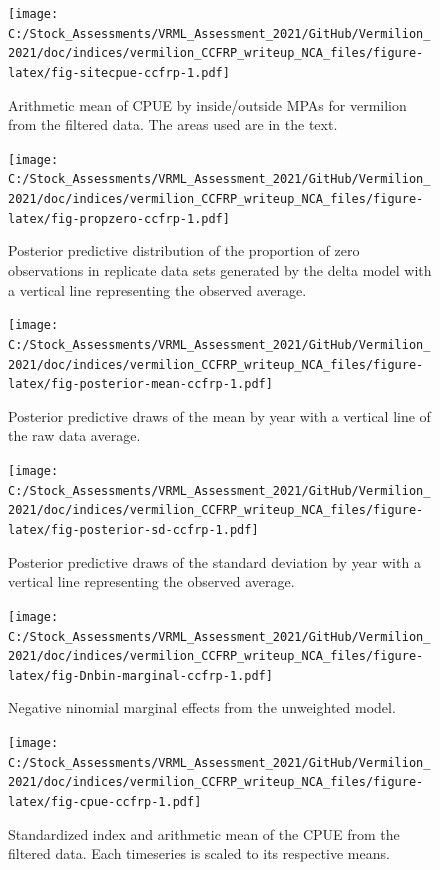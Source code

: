 \documentclass[
  english,
  a4paper,
]{article}
\begin{document}
\begin{figure}
\centering
\texttt{[image: C:/Stock\_Assessments/VRML\_Assessment\_2021/GitHub/Vermilion\_2021/doc/indices/vermilion\_CCFRP\_writeup\_NCA\_files/figure-latex/fig-sitecpue-ccfrp-1.pdf]}
\caption{\label{fig:fig-sitecpue-ccfrp}Arithmetic mean of CPUE by inside/outside MPAs for vermilion from the filtered data. The areas used are in the text.}
\end{figure}

\begin{figure}
\centering
\texttt{[image: C:/Stock\_Assessments/VRML\_Assessment\_2021/GitHub/Vermilion\_2021/doc/indices/vermilion\_CCFRP\_writeup\_NCA\_files/figure-latex/fig-propzero-ccfrp-1.pdf]}
\caption{\label{fig:fig-propzero-ccfrp}Posterior predictive distribution of the proportion of zero observations in replicate data sets generated by the delta model with a vertical line representing the observed average.}
\end{figure}

\begin{figure}
\centering
\texttt{[image: C:/Stock\_Assessments/VRML\_Assessment\_2021/GitHub/Vermilion\_2021/doc/indices/vermilion\_CCFRP\_writeup\_NCA\_files/figure-latex/fig-posterior-mean-ccfrp-1.pdf]}
\caption{\label{fig:fig-posterior-mean-ccfrp}Posterior predictive draws of the mean by year with a vertical line of the raw data average.}
\end{figure}

\begin{figure}
\centering
\texttt{[image: C:/Stock\_Assessments/VRML\_Assessment\_2021/GitHub/Vermilion\_2021/doc/indices/vermilion\_CCFRP\_writeup\_NCA\_files/figure-latex/fig-posterior-sd-ccfrp-1.pdf]}
\caption{\label{fig:fig-posterior-sd-ccfrp}Posterior predictive draws of the standard deviation by year with a vertical line representing the observed average.}
\end{figure}

\begin{figure}
\centering
\texttt{[image: C:/Stock\_Assessments/VRML\_Assessment\_2021/GitHub/Vermilion\_2021/doc/indices/vermilion\_CCFRP\_writeup\_NCA\_files/figure-latex/fig-Dnbin-marginal-ccfrp-1.pdf]}
\caption{\label{fig:fig-Dnbin-marginal-ccfrp}Negative ninomial marginal effects from the unweighted model.}
\end{figure}

\begin{figure}
\centering
\texttt{[image: C:/Stock\_Assessments/VRML\_Assessment\_2021/GitHub/Vermilion\_2021/doc/indices/vermilion\_CCFRP\_writeup\_NCA\_files/figure-latex/fig-cpue-ccfrp-1.pdf]}
\caption{\label{fig:fig-cpue-ccfrp}Standardized index and arithmetic mean of the CPUE from the filtered data. Each timeseries is scaled to its respective means.}
\end{figure}
\end{document}

